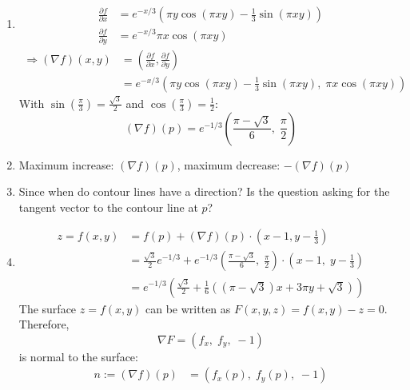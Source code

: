 \documentclass[11pt]{article}
\begin{document}
\begin{solution}
	\begin{enumerate}
		\item
		      $$
			      \begin{aligned}
				      \frac{\partial f}{\partial x} & = e^{-x/3} \left( \pi y \cos(\pi xy) - \frac{1}{3} \sin(\pi xy) \right) \\
				      \frac{\partial f}{\partial y} & = e^{-x/3} \pi x \cos(\pi xy)
			      \end{aligned}
		      $$
		      $$
			      \begin{aligned}
				      \Rightarrow (\nabla f)(x,y) & = \left( \frac{\partial f}{\partial x}, \frac{\partial f}{\partial y} \right)                  \\
				                                  & = e^{-x/3} \left( \pi y \cos(\pi xy) - \frac{1}{3} \sin(\pi xy), \; \pi x \cos(\pi xy) \right)
			      \end{aligned}
		      $$
		      With $\sin(\frac{\pi}{3}) = \frac{\sqrt{3}}{2}$ and $\cos(\frac{\pi}{3}) = \frac{1}{2}$:
		      $$
			      (\nabla f)(p) = e^{-1/3} \left( \frac{\pi - \sqrt{3}}{6}, \; \frac{\pi}{2} \right)
		      $$
		\item
		      Maximum increase: $(\nabla f)(p)$, maximum decrease: $-(\nabla f)(p)$
		\item
		      Since when do contour lines have a direction? Is the question asking for the tangent vector to the contour line at $p$?
		\item
		      $$
			      \begin{aligned}
				      z = f(x, y) & = f(p) + (\nabla f)(p) \cdot (x - 1, y - \frac{1}{3})                                                                                \\
				                  & = \frac{\sqrt{3}}{2} e^{-1/3} + e^{-1/3} \left( \frac{\pi - \sqrt{3}}{6}, \; \frac{\pi}{2} \right) \cdot (x - 1, \; y - \frac{1}{3}) \\
				                  & = e^{-1/3} \left( \frac{\sqrt{3}}{2} + \frac{1}{6} \left( (\pi - \sqrt{3}) x + 3 \pi y + \sqrt{3} \right) \right)
			      \end{aligned}
		      $$
		      The surface $z = f(x, y)$ can be written as $F(x, y, z) = f(x, y) - z = 0$. Therefore,
		      $$
			      \nabla F = (f_x, \; f_y, \; -1)
		      $$
		      is normal to the surface:
		      $$
			      \begin{aligned}
				      n := (\nabla f)(p) & = \left( f_x(p), \; f_y(p), \; -1\right)                                            \\

\end{aligned}$$
\end{enumerate}
\end{solution}
\end{document}
